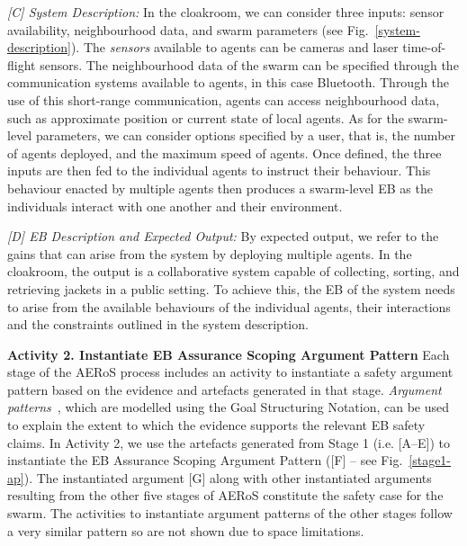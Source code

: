 \documentclass[runningheads]{llncs}
\begin{document}

\emph{[C] System Description:}
In the cloakroom, we can consider three inputs: sensor availability, neighbourhood data, and swarm parameters (see Fig.~\ref{system-description}). The \emph{sensors} available to agents can be cameras and laser time-of-flight sensors. 
The neighbourhood data of the swarm can be specified through the communication systems available to agents, in this case Bluetooth. 
Through the use of this short-range communication, agents can access neighbourhood data, such as approximate position or current state of local agents.  
As for the swarm-level parameters, we can consider options specified by a user, that is, the number of agents deployed, and the maximum speed of agents. %
Once defined, the three inputs are then fed to the individual agents to instruct their behaviour. This behaviour enacted by multiple agents then produces a swarm-level EB as the individuals interact with one another and their environment. 

\emph{[D] EB Description and Expected Output:}
By expected output, we refer to the gains that can arise from the system by deploying multiple agents. 
In the cloakroom, the output is a collaborative system capable of collecting, sorting, and retrieving jackets in a public setting. 
To achieve this, the EB of the system needs to %
arise from the available behaviours of the individual agents, their interactions and the constraints outlined in the system description.

\noindent\textbf{Activity 2. Instantiate EB Assurance Scoping Argument Pattern} Each stage of the AERoS process includes an activity to instantiate a safety argument pattern based on the evidence and artefacts generated in that stage. %
\emph{Argument patterns}~\cite{Hawkins2021}, which are modelled using the Goal Structuring Notation, can be used to explain the extent to which the evidence supports the relevant EB safety claims.  
In Activity 2, we use the artefacts generated from Stage 1 (i.e. [A–E]) to instantiate the EB Assurance Scoping Argument Pattern ([F] – see Fig.~\ref{stage1-ap}). 
The instantiated argument [G] along with other instantiated arguments resulting from the other five stages of AERoS constitute the safety case for the swarm. The activities to instantiate argument patterns of the other stages follow a very similar pattern so are not shown due to space limitations.
\end{document}
